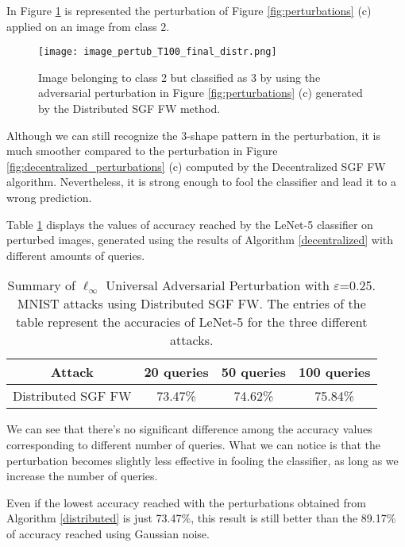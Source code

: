 In Figure \ref{fig:distributed} is represented the perturbation of Figure \ref{fig:perturbations} (c) applied on an image from class 2.

\begin{figure}[htbp]
	\centering
	\texttt{[image: image\_pertub\_T100\_final\_distr.png]}
	\caption{{\small Image belonging to class 2 but classified as 3 by using the adversarial perturbation in Figure \ref{fig:perturbations} (c) generated by the Distributed SGF FW method.}}
	\label{fig:distributed}
\end{figure}
Although we can still recognize the 3-shape pattern in the
perturbation, it is much smoother compared to the perturbation in Figure \ref{fig:decentralized_perturbations} (c) computed by the Decentralized
SGF FW algorithm. Nevertheless, it is strong enough to fool the classifier and lead it to a wrong prediction.

Table \ref{tab:distributed} displays the values of accuracy reached by the LeNet-5 classifier on perturbed images, generated using the results of Algorithm \ref{decentralized} with different amounts of queries.\\
\begin{table}[htbp]
	\begin{center}
		\begin{adjustwidth}{-.6cm}{}
			\begin{tabular}{c|ccc}
				\textbf{Attack} &          20 \textbf{queries} &      50 \textbf{queries} &     100 \textbf{queries} \\
				\midrule
				{\small Distributed SGF FW}     &   73.47\% &    74.62\% &       75.84\% \\
			\end{tabular}
		\end{adjustwidth}
	\end{center}
	\caption{{\small Summary of $\ell_\infty$ Universal Adversarial Perturbation with $\varepsilon$=0.25. MNIST attacks using Distributed SGF FW. The entries of the table represent the accuracies of LeNet-5 for the three different attacks.}}
	\label{tab:distributed}
\end{table}

We can see that there's no significant
difference among the accuracy values corresponding to different number of queries. What we can notice is that the
perturbation becomes slightly less effective in fooling the classifier, as long as we increase the number of queries.

Even if the lowest accuracy reached with the perturbations obtained from Algorithm \ref{distributed} is just 73.47\%, this result is still better than the 89.17\% of accuracy reached using Gaussian noise.